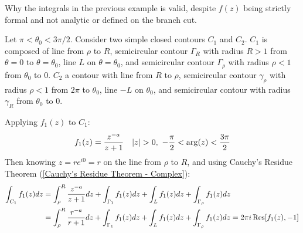 \documentclass[12pt, english]{book}
\makeatletter
\renewenvironment{proof}[1][\proofname]{\par
	\pushQED{\qed}%
	\normalfont \topsep6\p@\@plus6\p@\relax
	\list{}{%
		\settowidth{\leftmargin}{\itshape\proofname:\hskip\labelsep}%
		\setlength{\labelwidth}{0pt}%
		\setlength{\itemindent}{-\leftmargin}%
	}%
	\item[\hskip\labelsep\itshape#1\@addpunct{:}]\ignorespaces
	}{ \popQED\endlist\@endpefalse}
\makeatother
\begin{document}
	\begin{example}
		Why the integrals in the previous example is valid, despite \(f(z)\) being strictly formal and not analytic or defined on the branch cut.
		\begin{proof}
			{\color{Grey}
				Let \(\pi < \theta_0 < 3\pi/2\). Consider two simple closed contours 
				\(C_1\) and \(C_2\). \(C_1\) is composed of line from \(\rho\) to \(R\), semicircular contour \(\Gamma_R\) with radius \(R >1\) from \(\theta = 0\) to \(\theta = \theta_0\), line \(L\) on \(\theta = \theta_0\), and semicircular contour \(\Gamma_\rho\) with radius \(\rho<1\) from \(\theta_0\) to \(0\). 
				\(C_2\) a contour with line from \(R\) to \(\rho\), semicircular contour \(\gamma_\rho\) with radius \(\rho<1\) from \(2\pi\) to \(\theta_0\), line \(-L\) on \(\theta_0\), and semicircular contour with radius \(\gamma_R\) from \(\theta_0\) to \(0\).
				
				Applying \(f_1 (z)\) to \(C_1\):
				\begin{align*}
					f_1 (z) &= \frac{z^{-a}}{z+1}	
					& \abs{z}>0, \ -\frac{\pi}{2} < \arg(z) < \frac{3\pi}{2}
				\end{align*}
				Then knowing \(z = re^{i0} = r\) on the line from \(\rho\) to \(R\), and using Cauchy's Residue Theorem (\cref{Cauchy's Residue Theorem - Complex}):
				\begin{align*}
					\int_{C_1} f_1 (z) dz 
					&= \int_{\rho}^{R} \frac{z^{-a}}{z+1} dz + \int_{\Gamma_1} f_1 (z) dz
					+ \int_{L} f_1 (z) dz + \int_{\Gamma_\rho} f_1 (z) dz \\
					&= \int_{\rho}^{R} \frac{r^{-a}}{r+1} dz + \int_{\Gamma_1} f_1 (z) dz
					+ \int_{L} f_1 (z) dz + \int_{\Gamma_\rho} f_1 (z) dz 
					= 2\pi i \Res[f_1 (z), -1]
				\end{align*}
				
}
\end{proof}
\end{example}
\end{document}
